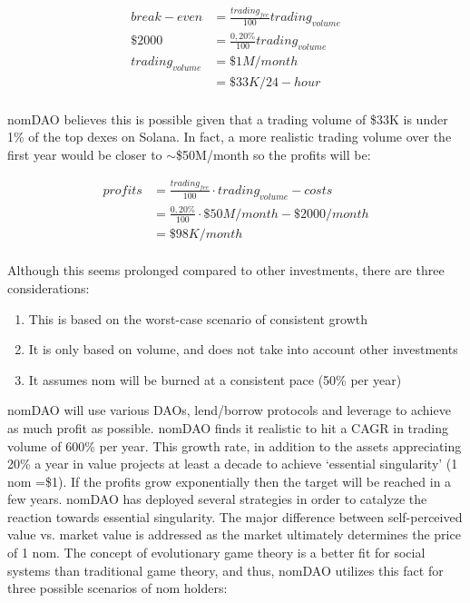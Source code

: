 \documentclass[12pt]{article}
\begin{document}
\begin{equation}\label{break-even}
\begin{split}
break-even &=\frac{trading_{fee}}{100} trading_{volume}\\
\$2000  &=\frac{0,20\%}{100} trading_{volume}\\
trading_{volume} &=\$1M/month\\
 &=\$33K/24-hour
\end{split}
\end{equation}
\\

nomDAO believes this is possible given that a trading volume of \$33K is under 1\% of the top dexes on Solana. In fact, a more realistic trading volume over the first year would be closer to $\sim$\$50M/month so the profits will be:
 
\begin{equation}\label{income by 10x}
\begin{split}
profits &=\frac{trading_{fee}}{100}  \cdot trading_{volume} - costs\\
 &=\frac{0,20\%}{100} \cdot \$50M/month - \$2000/month\\
 &=\$98K/month
\end{split}
\end{equation}
\\


Although this seems prolonged compared to other investments, there are three considerations:

\begin{enumerate}[label=(\roman*)]

\item This is based on the worst-case scenario of consistent growth

\item It is only based on volume, and does not take into account other investments

\item It assumes nom will be burned at a consistent pace (50\% per year)\\

\end{enumerate}


nomDAO will use various DAOs, lend/borrow protocols and leverage to achieve as much profit as possible. nomDAO finds it realistic to hit a CAGR in trading volume of 600\% per year. This growth rate, in addition to the assets appreciating 20\% a year in value projects  at least a decade to achieve ‘essential singularity’ (1 nom =\$1). If the profits grow exponentially then the target will be reached in a few years. nomDAO has deployed several strategies in order to catalyze the reaction towards essential singularity. The major difference between self-perceived value vs. market value is addressed as the market ultimately determines the price of 1 nom. The concept of evolutionary game theory \cite{egt} is a better fit for social systems than traditional game theory, and thus, nomDAO utilizes this fact for three possible scenarios of nom holders:
\end{document}
